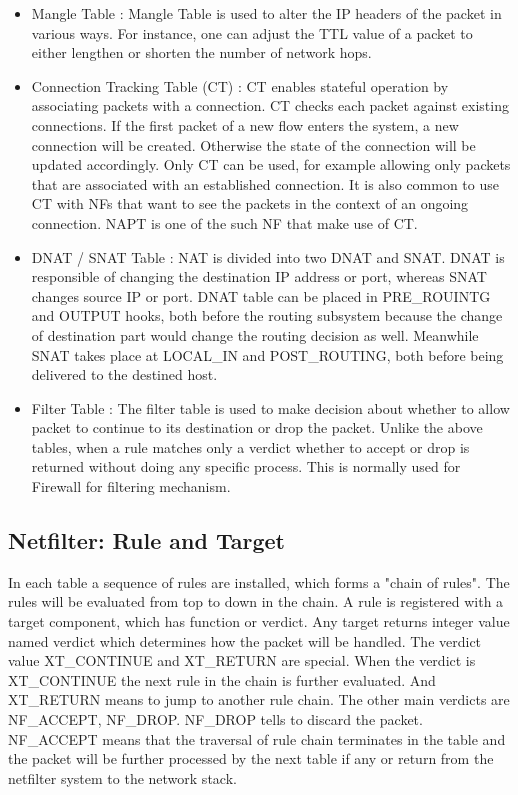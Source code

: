 \begin{itemize}
	\item Mangle Table : Mangle Table is used to alter the IP headers of the packet in various ways. For instance, one can adjust the TTL value of a packet to either lengthen or shorten the number of network hops. 
	\item Connection Tracking Table (CT) : CT enables stateful operation by associating packets with a connection. CT checks each packet against existing connections. If the first packet of a new flow enters the system, a new connection will be created. Otherwise the state of the connection will be updated accordingly. Only CT can be used, for example allowing only packets that are associated with an established connection. It is also common to use CT with NFs that want to see the packets in the context of an ongoing connection. NAPT is one of the such NF that make use of CT.
	\item DNAT / SNAT Table : NAT is divided into two DNAT and SNAT. DNAT is responsible of changing the destination IP address or port, whereas SNAT changes source IP or port. DNAT table can be placed in PRE\_ROUINTG and OUTPUT hooks, both before the routing subsystem because the change of destination part would change the routing decision as well. Meanwhile SNAT takes place at LOCAL\_IN and POST\_ROUTING, both before being delivered to the destined host. 
	\item Filter Table : The filter table is used to make decision about whether to allow packet to continue to its destination or drop the packet. Unlike the above tables, when a rule matches only a verdict whether to accept or drop is returned without doing any specific process. This is normally used for Firewall for filtering mechanism. 
\end{itemize}

\subsection{Netfilter: Rule and Target}
In each table a sequence of rules are installed, which forms a "chain of rules". The rules will be evaluated from top to down in the chain. A rule is registered with a target component, which has function or verdict. Any target returns integer value named verdict which determines how the packet will be handled.
 The verdict value XT\_CONTINUE and XT\_RETURN are special. When the verdict is XT\_CONTINUE the next rule in the chain is further evaluated. And XT\_RETURN means to jump to another rule chain. The other main verdicts are NF\_ACCEPT, NF\_DROP. NF\_DROP tells to discard the packet. NF\_ACCEPT means that the traversal of rule chain terminates in the table and the packet will be further processed by the next table if any or return from the netfilter system to the network stack. 
 
